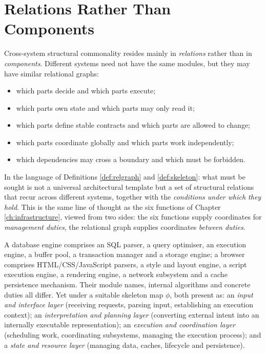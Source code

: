 \section{Relations Rather Than Components}\label{sec:relations-converge}

\begin{principle}\label{pr:relations}
Cross-system structural commonality resides mainly in \emph{relations} rather than in
\emph{components}. Different systems need not have the same modules, but they may have
similar relational graphs:
\begin{itemize}
\item which parts decide and which parts execute;
\item which parts own state and which parts may only read it;
\item which parts define stable contracts and which parts are allowed to change;
\item which parts coordinate globally and which parts work independently;
\item which dependencies may cross a boundary and which must be forbidden.
\end{itemize}
\end{principle}

In the language of Definitions \ref{def:relgraph} and \ref{def:skeleton}: what must be
sought is not a universal architectural template but a set of structural relations that
recur across different systems, together with the \emph{conditions under which they hold}.
This is the same line of thought as the six functions of Chapter \ref{ch:infrastructure},
viewed from two sides: the six functions supply coordinates for \emph{management duties},
the relational graph supplies coordinates \emph{between duties}.

\begin{example}\label{ex:db-browser}
A database engine comprises an SQL parser, a query optimiser, an execution engine, a buffer
pool, a transaction manager and a storage engine; a browser comprises HTML/CSS/JavaScript
parsers, a style and layout engine, a script execution engine, a rendering engine, a network
subsystem and a cache persistence mechanism. Their module names, internal algorithms and
concrete duties all differ. Yet under a suitable skeleton map $\phi$, both present as: an
\emph{input and interface layer} (receiving requests, parsing input, establishing an
execution context); an \emph{interpretation and planning layer} (converting external intent
into an internally executable representation); an \emph{execution and coordination layer}
(scheduling work, coordinating subsystems, managing the execution process); and a
\emph{state and resource layer} (managing data, caches, lifecycle and persistence).
\end{example}

